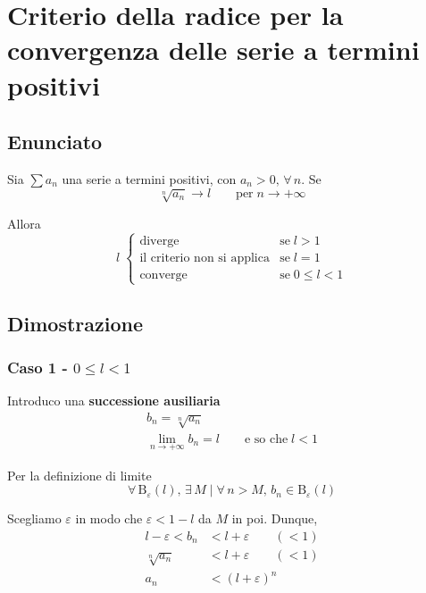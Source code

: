 \documentclass[../../dimostrazioni]{subfiles}
\begin{document}
    \chapter{Criterio della radice per la convergenza delle serie a termini positivi}
    \label{criterioRadiceSerie}

        \section*{Enunciato}

            Sia \(\sum a_n\) una serie a termini positivi, con \(a_n > 0, \, \forall \, n\). Se
             \[\sqrt[n]{a_n} \rightarrow l \qquad \text{per} \; n  \rightarrow +\infty \]
            
            Allora
            \[
                l \;
                \begin{cases}
                    \text{diverge} & \text{se} \; l > 1\\
                    \text{il criterio non si applica} & \text{se} \; l = 1\\
                    \text{converge} & \text{se} \; 0 \leqslant l < 1
                \end{cases}
            \]
            
        \section*{Dimostrazione}
            
            \subsection*{Caso 1 - \(0 \leqslant l < 1\)} 
                    
                Introduco una \textbf{successione ausiliaria}
                \begin{gather*}
                    b_n = \sqrt[n]{a_n}\\
                    \lim_{n \to +\infty} b_n = l \qquad \text{e so che} \; l < 1
                \end{gather*}

                Per la definizione di limite
                \[\forall \, \mathrm{B}_\varepsilon (l), \, \exists \, M \mid \forall \, n > M, \, b_n \in \mathrm{B}_\varepsilon (l) \]

                Scegliamo \(\varepsilon\) in modo che \(\varepsilon < 1 - l\) da \(M\) in poi. Dunque,
                \begin{align*}
                    l - \varepsilon < b_n &< l + \varepsilon \qquad (<1) \\
                    \sqrt[n]{a_n} &< l + \varepsilon \qquad (<1) \\
                    a_n &< (l+\varepsilon)^{n}  
                \end{align*}
                                     
\end{document}
